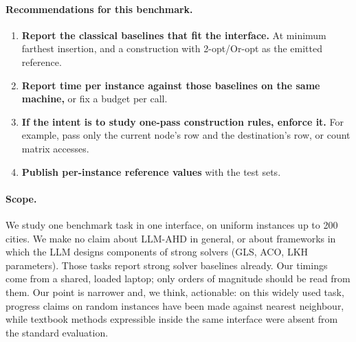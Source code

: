 \paragraph{Recommendations for this benchmark.}
\begin{enumerate}
\item \textbf{Report the classical baselines that fit the interface.} At minimum farthest
insertion, and a construction with 2-opt/Or-opt as the emitted reference.
\item \textbf{Report time per instance against those baselines on the same machine,} or fix a budget
per call.
\item \textbf{If the intent is to study one-pass construction rules, enforce it.} For example, pass
only the current node's row and the destination's row, or count matrix accesses.
\item \textbf{Publish per-instance reference values} with the test sets.
\end{enumerate}

\paragraph{Scope.} We study one benchmark task in one interface, on uniform instances up to 200
cities. We make no claim about LLM-AHD in general, or about frameworks in which the LLM designs
components of strong solvers (GLS, ACO, LKH parameters). Those tasks report strong solver baselines
already. Our timings come from a shared, loaded laptop; only orders of magnitude should be read
from them. Our point is narrower and, we think, actionable: on this widely used task, progress claims on random instances have been made against nearest neighbour, while textbook methods expressible inside the same interface were absent from the standard evaluation.
